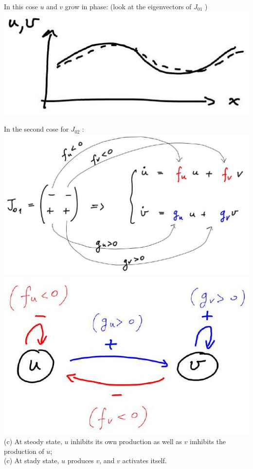 \documentclass[10pt]{article}
\begin{document}
In this cose $u$ and $v$ grow in phase: (look at the eigenvectors of $J_{01}$ )\\
\includegraphics[max width=\textwidth, center]{2025_10_17_3cf351a4349ae3691080g-12(1)}

In the second cose for $J_{02}$ :\\
\includegraphics[max width=\textwidth, center]{2025_10_17_3cf351a4349ae3691080g-12(3)}\\
\includegraphics[max width=\textwidth, center]{2025_10_17_3cf351a4349ae3691080g-12(2)}\\
(c) At steody state, $u$ inhibits its own production as well as $v$ imhibits the production of $u$;\\
(c) At stady state, $u$ produces $v$, and $v$ activates itself.
\end{document}
